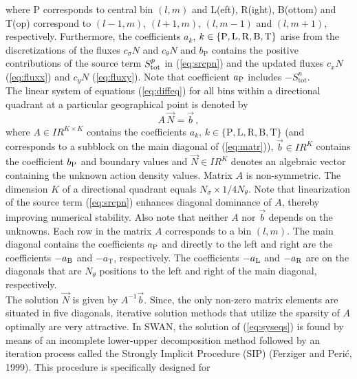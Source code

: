 \documentclass[12pt]{book}
\begin{document}
where P corresponds to central bin $(l,m)$ and L(eft), R(ight), B(ottom)
and T(op) correspond to $(l-1,m)$, $(l+1,m)$, $(l,m-1)$ and $(l,m+1)$, respectively.
Furthermore, the coefficients
$a_k$, $k \in \{ \rm P,\rm L, \rm R, \rm B, \rm T \}$ arise from the
discretizations of the fluxes $c_{\sigma} N$ and $c_{\theta} N$ and $b_{\mathrm{P}}$ contains the positive contributions
of the source term $S_{\rm tot}^p$ in (\ref{eq:srcpn}) and the updated fluxes $c_x N$ (\ref{eq:fluxx}) and
$c_y N$ (\ref{eq:fluxy}). Note that coefficient $a_{\rm P}$ includes $-S_{\mathrm{tot}}^n$.
\\[2ex]
\noindent
The linear system of equations (\ref{eq:diffeq}) for all bins within a directional quadrant
at a particular geographical point is denoted by
\begin{equation}
  A \, \vec{N} = \vec{b} \, ,
  \label{eq:syseqs}
\end{equation}
where $A \in {\mbox{$I\!\!R$}}^{K \times K}$ contains the coefficients $a_k$, $k \in \{ \mathrm{P},
\mathrm{L}, \mathrm{R}, \mathrm{B}, \mathrm{T} \}$ (and
corresponds to a subblock on the main diagonal of (\ref{eq:matr})),
$\vec{b} \in {\mbox{$I\!\!R$}}^{K}$ contains the coefficient $b_{\rm P}$ and boundary values and
$\vec{N} \in {\mbox{$I\!\!R$}}^{K}$ denotes an algebraic vector containing the unknown
action density values. Matrix $A$ is non-symmetric. The dimension $K$ of a
directional quadrant equals $N_{\sigma} \times 1/4 N_{\theta}$.
Note that linearization of the source term (\ref{eq:srcpn}) enhances diagonal dominance of $A$, thereby improving numerical stability.
Also note that neither $A$ nor $\vec{b}$ depends on the unknowns.
Each row in the matrix $A$ corresponds to a bin
$(l,m)$. The main diagonal contains the coefficients
$a_{\rm P}$ and directly to the left and right are the coefficients
$-a_{\rm B}$ and $-a_{\mathrm{T}}$, respectively. The coefficients $-a_{\rm L}$ and $-a_{\rm R}$
are on the diagonals that are $N_{\theta}$ positions to the left and
right of the main diagonal, respectively.
\\[2ex]
\noindent
The solution $\vec{N}$ is given by $A^{-1} \vec{b}$. Since, the only non-zero matrix elements are situated in five diagonals,
iterative solution methods that utilize the sparsity of $A$ optimally are very attractive.
In SWAN,
the solution of (\ref{eq:syseqs}) is found by means of an incomplete lower-upper decomposition method followed by an
iteration process called the
Strongly Implicit Procedure (SIP) (Ferziger and Peri\'{c}, 1999). This procedure is specifically designed for
\end{document}

